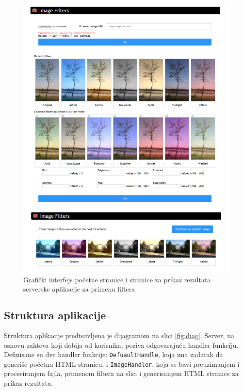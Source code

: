 \documentclass[12pt,oneside]{memoir}
\begin{document}
\begin{figure}
\begin{center}
\includegraphics[scale=1.4]{interface.png}
\end{center}
\caption{Grafički interfejs početne stranice i stranice za prikaz rezultata serverske aplikacije za primenu filtera}
\label{fig:interface}
\end{figure}

\subsection{Struktura aplikacije}
Struktura aplikacije predtsavljena je dijagramom na slici \ref{fig:diag}. Server, na osnovu zahteva koji dobija od korisnika, poziva odgovarajuću handler funkciju. Definisane su dve handler funkcije: \texttt{DefuaultHandle}, koja ima zadatak da generiše početnu HTML stranicu, i \texttt{ImageHandler}, koja se bavi preuzimanjem i procesiranjem fajla, primenom filtera na slici i generisanjem HTML stranice za prikaz rezultata. 
 
\end{document}
